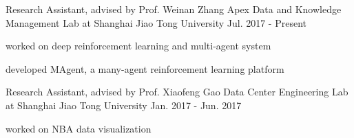 

\begin{cventries}

  \cventry
    {Research Assistant, advised by Prof. Weinan Zhang} %
    {Apex Data and Knowledge Management Lab at Shanghai Jiao Tong University} %
    {Jul. 2017 - Present} %
    {} %
    {
      \begin{cvitems} %
      \item {worked on deep reinforcement learning and multi-agent system}
      \item {developed MAgent, a many-agent reinforcement learning platform}
      \end{cvitems}
    }

  \cventry
    {Research Assistant, advised by Prof. Xiaofeng Gao} %
    {Data Center Engineering Lab at Shanghai Jiao Tong University} %
    {Jan. 2017 - Jun. 2017} %
    {} %
    {
      \begin{cvitems} %
      \item {worked on NBA data visualization}
      \end{cvitems}
    }

\end{cventries}
